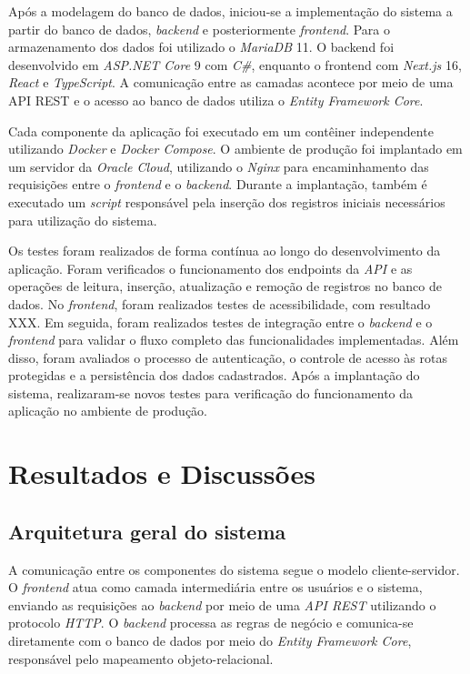 \documentclass[12pt]{unisenaiclass}
\begin{document}
Após a modelagem do banco de dados, iniciou-se a implementação do sistema a partir do banco de dados, \textit{backend} e posteriormente \textit{frontend}. Para o armazenamento dos dados foi utilizado o \textit{MariaDB} 11. O backend foi desenvolvido em \textit{ASP.NET Core} 9 com\textit{ C\#}, enquanto o frontend com \textit{Next.js} 16, \textit{React} e \textit{TypeScript}. A comunicação entre as camadas acontece por meio de uma API REST e o acesso ao banco de dados utiliza o \textit{Entity Framework Core}.

Cada componente da aplicação foi executado em um contêiner independente utilizando \textit{Docker} e \textit{Docker Compose}. O ambiente de produção foi implantado em um servidor da \textit{Oracle Cloud}, utilizando o \textit{Nginx} para encaminhamento das requisições entre o \textit{frontend} e o \textit{backend}. Durante a implantação, também é executado um \textit{script} responsável pela inserção dos registros iniciais necessários para utilização do sistema.

Os testes foram realizados de forma contínua ao longo do desenvolvimento da aplicação. Foram verificados o funcionamento dos endpoints da \textit{API} e as operações de leitura, inserção, atualização e remoção de registros no banco de dados. No \textit{frontend}, foram realizados testes de acessibilidade, com resultado XXX. Em seguida, foram realizados testes de integração entre o \textit{backend} e o \textit{frontend} para validar o fluxo completo das funcionalidades implementadas. Além disso, foram avaliados o processo de autenticação, o controle de acesso às rotas protegidas e a persistência dos dados cadastrados. Após a implantação do sistema, realizaram-se novos testes para verificação do funcionamento da aplicação no ambiente de produção.

\section{Resultados e Discussões}

\subsection{Arquitetura geral do sistema}

A comunicação entre os componentes do sistema segue o modelo cliente-servidor. O \textit{frontend} atua como camada intermediária entre os usuários e o sistema, enviando as requisições ao \textit{backend} por meio de uma \textit{API REST} utilizando o protocolo \textit{HTTP}. O \textit{backend} processa as regras de negócio e comunica-se diretamente com o banco de dados por meio do \textit{Entity Framework Core}, responsável pelo mapeamento objeto-relacional.
\end{document}
